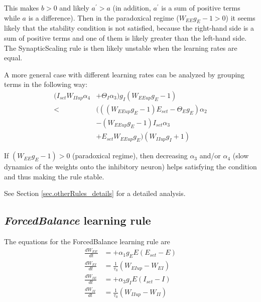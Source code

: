 \documentclass[twocolumn]{article}
\newcommand{\EE}{\mathit{EE}}
\newcommand{\EI}{\mathit{EI}}
\newcommand{\IE}{\mathit{IE}}
\newcommand{\II}{\mathit{II}}
\newcommand{\set}{\mathit{set}}
\newcommand{\up}{\mathit{up}}
\begin{document}
\noindent This makes $b>0$ and likely $a^\prime>a$ (in addition, $a^\prime$ is a sum of positive terms while $a$ is a difference). Then in the paradoxical regime ($W_{\EE}g_E - 1 > 0$) it seems likely that the stability condition is not satisfied, because the right-hand side is a sum of positive terms and one of them is likely greater than the left-hand side. The SynapticScaling rule is then likely unstable when the learning rates are equal.

A more general case with different learning rates can be analyzed by grouping terms in the following way:
\begin{displaymath}
\begin{aligned}
(I_{\set} W_{\II\up} \alpha_4 & + \Theta_I\alpha_3) g_I(W_{\EE\up} g_E - 1) \\
< & (((W_{\EE\up} g_E - 1) E_{\set} - \Theta_E g_E)\alpha_2 \\
& -(W_{\EE\up} g_E - 1) I_{\set}\alpha_3 \\
& + E_{\set} W_{\EE\up} g_E) (W_{\II\up} g_I + 1)
\end{aligned}
\label{eq.SS_stable_cond_v3}
\end{displaymath}

\noindent If $(W_{EE}g_E - 1) > 0$ (paradoxical regime), then decreasing $\alpha_3$ and/or $\alpha_4$ (slow dynamics of the weights onto the inhibitory neuron) helps satisfying the condition and thus making the rule stable.

See Section \ref{sec.otherRules_details} for a detailed analysis.




\subsection{{\em ForcedBalance} learning rule}

The equations for the ForcedBalance learning rule are
\begin{equation}
\begin{aligned}
\frac{dW_{\EE}}{dt} & = +\alpha_1 g_E E(E_{\set} - E) \\
\frac{dW_{\EI}}{dt} & = \frac{1}{\tau_0} (W_{\EI\up} - W_{\EI}) \\
\frac{dW_{\IE}}{dt} & = +\alpha_3 g_I E(I_{\set} - I) \\
\frac{dW_{\II}}{dt} & = \frac{1}{\tau_0} (W_{\II\up} - W_{\II})
\end{aligned}
\label{eq.FB_summary}
\end{equation}
\end{document}
